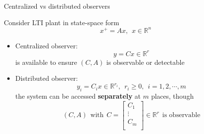 \documentclass{beamer}
\newcommand{\R}{\mathbb{R}}
\begin{document}
\begin{frame}{\color{blue} Centralized vs distributed observers}

Consider LTI plant in state-space form
\begin{equation*}
x^{+}=A x,~~ x\in\R^{n}
\end{equation*}

\begin{itemize}
  \item Centralized observer:
\begin{equation*}
y=Cx \in\R^{r}
\end{equation*}
is available to ensure $(C,A)$ is observable or detectable

  \item Distributed observer:
\begin{equation*}
y_{i}=C_{i}x\in\R^{r_{i}},~~ r_{i}\geq0,~~ i=1,2,\cdots,m
\end{equation*}
the system can be accessed \textbf{separately} at $m$ places, though
\begin{equation*}
(C,A) ~~\text{with}~~ C=\begin{bmatrix} C_{1} \\ \vdots \\ C_{m} \\   \end{bmatrix}\in\R^{r} ~~\text{is observable}
\end{equation*}
\end{itemize}

\end{frame}
\end{document}
